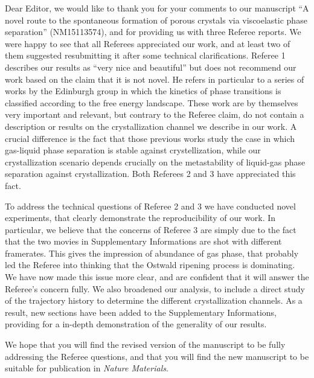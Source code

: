 \documentclass[11pt]{article}
\begin{document}
\doublespacing



\doublespacing

\noindent
Dear Editor,
\vskip 0.3cm
we would like to thank you for your comments to our manuscript ``A novel route to the spontaneous formation of porous crystals via viscoelastic phase separation'' (NM15113574),
and for providing us with three Referee reports.
We were happy to see that all Referees appreciated our work, and at least two of them suggested
resubmitting it after some technical clarifications. Referee 1 describes our results as ``very nice and beautiful'' but does not recommend our work
based on the claim that it is not novel. He refers in particular to a series of works by the Edinburgh group in which the kinetics of phase
transitions is classified according to the free energy landscape. These work are by themselves very important and relevant, but contrary
to the Referee claim, do not contain a description or results on the crystallization channel we describe in our work. A crucial difference is
the fact that those previous works
study the case in which gas-liquid phase separation is stable against crystellization, while our crystallization scenario depends crucially
on the metastability of liquid-gas phase separation against crystallization. Both Referees 2 and 3 have appreciated this fact.

To address the technical questions of Referee 2 and 3 we have conducted novel experiments, that clearly demonstrate the reproducibility
of our work. In particular, we believe that the concerns of Referee 3 are simply due to the fact that the two movies in Supplementary Informations
are shot with different framerates. This gives the impression of abundance of gas phase, that probably led the Referee into thinking that the Ostwald
ripening process is dominating. We have now made this issue more clear, and are confident that it will answer the Referee's concern fully.
We also broadened our analysis, to include a direct study of the trajectory history to determine the different crystallization
channels. As a result, new sections have been added to the Supplementary Informations, providing for a in-depth demonstration of the generality of our results.

We hope that you will find the revised version of the manuscript to be fully addressing the Referee questions, and
that you will find the new manuscript to be suitable for publication in \emph{Nature Materials}.
\end{document}
